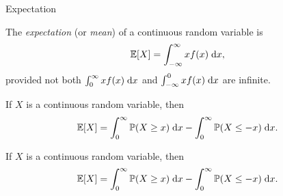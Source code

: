 %
\begin{note}
  \begin{field}
    Expectation
  \end{field}
  \begin{field}
    \begin{defi}[Expectation]
      The \emph{expectation} (or \emph{mean}) of a continuous random variable is
      \[
        \mathbb{E}[X] = \int_{-\infty}^\infty xf(x) \;\mathrm{d} x,
      \]
      provided not both $\int_0^\infty xf(x)\;\mathrm{d} x$ and $\int_{-\infty}^0 xf(x) \;\mathrm{d} x$ are infinite.
    \end{defi}
  \end{field}
  \xplain{}%
\end{note}

\begin{note}
  \begin{field}
    \begin{thm}
      If $X$ is a continuous random variable, then
      \[
        \mathbb{E}[X] = \int_0^\infty \mathbb{P}(X \geq x)\;\mathrm{d} x - \int_0^\infty \mathbb{P}(X \leq -x)\;\mathrm{d} x.
      \]
    \end{thm}
  \end{field}
  \begin{field}
    \begin{thm}
      If $X$ is a continuous random variable, then
      \[
        \mathbb{E}[X] = \int_0^\infty \mathbb{P}(X \geq x)\;\mathrm{d} x - \int_0^\infty \mathbb{P}(X \leq -x)\;\mathrm{d} x.
      \]
    \end{thm}
  \end{field}
  \xplain{}%
\end{note}

